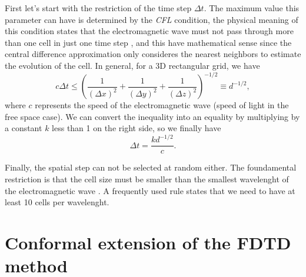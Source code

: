 \documentclass[12pt, oneside]{book}
\begin{document}
\indent First let's start with the restriction of the time step $\Delta t$. The maximum value this parameter can have is determined by the \textit{CFL} condition, the physical meaning of this condition states that the electromagnetic wave must not pass through more than one cell in just one time step \cite{kunz1993finite}, and this have mathematical sense since the central difference approximation only consideres the nearest neighbors to estimate the evolution of the cell. In general, for a 3D rectangular grid, we have
\begin{equation}
    c \Delta t \leq \left( \dfrac{1}{(\Delta x)^2} + \dfrac{1}{(\Delta y)^2} + \dfrac{1}{(\Delta z)^2} \right)^{-1/2} \equiv d^{-1/2},
\end{equation}
where $c$ represents the speed of the electromagnetic wave (speed of light in the free space case). We can convert the inequality into an equality by multiplying by a constant $k$ less than 1 on the right side, so we finally have
\begin{equation}
    \Delta t = \dfrac{kd^{-1/2}}{c}.
    \label{eq:CFL}
\end{equation}

Finally, the spatial step can not be selected at random either. The foundamental restriction is that the cell size must be smaller than the smallest wavelenght of the electromagnetic wave \cite{kunz1993finite}. A frequently used rule states that we need to have at least 10 cells per wavelenght.

\chapter{Conformal extension of the FDTD method}





\end{document}
